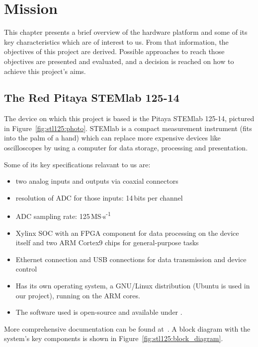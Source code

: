 \chapter{Mission} %
\label{ch:mission}

This chapter  presents a brief overview  of the hardware platform  and some of
its key  characteristics which are  of interest to us. From  that information,
the objectives of this project are derived. Possible approaches to reach those
objectives are  presented and evaluated, and  a decision is reached  on how to
achieve this project's aims.


\section{The Red Pitaya STEMlab 125-14} %
\label{sec:stl125}

The  device on  which this  project  is based  is the  Pitaya STEMlab  125-14,
pictured  in Figure~\ref{fig:stl125:photo}. STEMlab  is a  compact measurement
instrument (fits  into the palm  of a hand)  which can replace  more expensive
devices like  oscilloscopes by using  a computer for data  storage, processing
and presentation.

Some of its key specifications relavant to us are:
\begin{itemize}\tightlist
    \item
        two analog inputs and outputs via coaxial connectors
    \item
        resolution of ADC for those inputs: \num{14}\,bits per channel
    \item
        ADC sampling rate: \num{125}\,MS$\cdot$s\textsuperscript{-1}
    \item
        Xylinx SOC  with an FPGA component  for data processing on  the device
        itself and two ARM Cortex9 chips for general-purpose tasks
    \item
        Ethernet  connection and  USB  connections for  data transmission  and
        device control
    \item
        Has its own operating system, a GNU/Linux distribution (Ubuntu is used
        in our project), running on the ARM cores.
    \item
        The software used is open-source and available under \cite{pita:github}.
\end{itemize}
More  comprehensive documentation  can be  found at~\cite{pita:readthedocs}. A
block   diagram   with    the   system's   key   components    is   shown   in
Figure~\ref{fig:stl125:block_diagram}.

